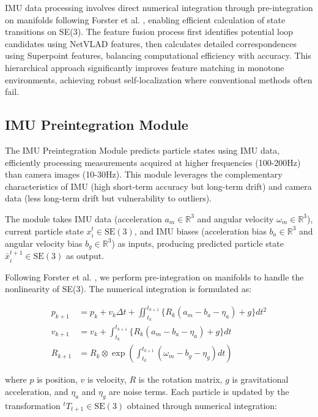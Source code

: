 \documentclass[a4paper,fleqn,10pt,twocolumn]{SICE_ISCS}
\begin{document}
IMU data processing involves direct numerical integration through pre-integration on manifolds following Forster et al. \cite{Forster2017}, enabling efficient calculation of state transitions on SE(3). The feature fusion process first identifies potential loop candidates using NetVLAD features, then calculates detailed correspondences using Superpoint features, balancing computational efficiency with accuracy. This hierarchical approach significantly improves feature matching in monotone environments, achieving robust self-localization where conventional methods often fail.

\subsection{IMU Preintegration Module}

The IMU Preintegration Module predicts particle states using IMU data, efficiently processing measurements acquired at higher frequencies (100-200Hz) than camera images (10-30Hz). This module leverages the complementary characteristics of IMU (high short-term accuracy but long-term drift) and camera data (less long-term drift but vulnerability to outliers).

The module takes IMU data (acceleration $a_m \in \mathbb{R}^3$ and angular velocity $\omega_m \in \mathbb{R}^3$), current particle state $x_i^t \in \mathrm{SE}(3)$, and IMU biases (acceleration bias $b_a \in \mathbb{R}^3$ and angular velocity bias $b_g \in \mathbb{R}^3$) as inputs, producing predicted particle state $\bar{x}_i^{t+1} \in \mathrm{SE}(3)$ as output.

Following Forster et al. \cite{Forster2017}, we perform pre-integration on manifolds to handle the nonlinearity of SE(3). The numerical integration is formulated as:

\begin{align}
p_{k+1} &= p_k + v_k \Delta t + \iint_{t_k}^{t_{k+1}} \{R_k(a_m - b_a - \eta_a) + g\} dt^2 \\
v_{k+1} &= v_k + \int_{t_k}^{t_{k+1}} \{R_k(a_m - b_a - \eta_a) + g\} dt \\
R_{k+1} &= R_k \otimes \exp\left(\int_{t_k}^{t_{k+1}} (\omega_m - b_g - \eta_g) dt\right)
\end{align}

where $p$ is position, $v$ is velocity, $R$ is the rotation matrix, $g$ is gravitational acceleration, and $\eta_a$ and $\eta_g$ are noise terms. Each particle is updated by the transformation $^t T_{t+1} \in \mathrm{SE}(3)$ obtained through numerical integration:
\end{document}
